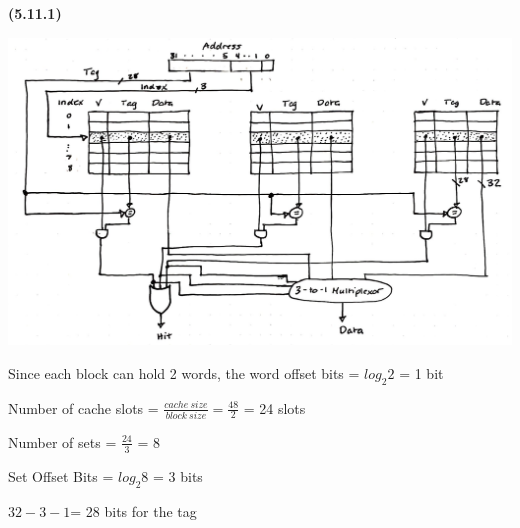 \documentclass[11pt]{article}
\renewcommand\part[1]{\vspace{.10in}\textbf{(#1)}\par}
\begin{document}
	\part{5.11.1}
		\includegraphics{images/yeet.png}\par
		Since each block can hold 2 words, the word offset bits = $log_{2}2$ = 1 bit\par
		Number of cache slots = $\frac{cache\:size}{block\:size} = \frac{48}{2}$ = 24 slots\par
		Number of sets = $\frac{24}{3}$ = 8\par
		Set Offset Bits = $log_{2}8$ = 3 bits\par
		$32-3-1$= 28 bits for the tag \par
	
	\newpage
\end{document}

